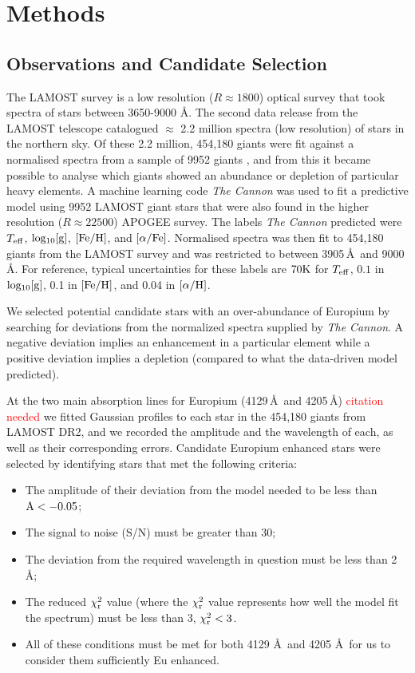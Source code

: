 \documentclass[a4paper,fleqn,usenatbib]{mnras}
\newcommand{\todo}[1]{\textcolor{red}{#1}}
\begin{document}
	\section{Methods}
	
	\subsection{Observations and Candidate Selection}
	
	The LAMOST survey is a low resolution ($R\approx1800$) optical survey that took spectra of stars between 3650-9000 \AA. The second data release from the LAMOST telescope catalogued $\approx$ 2.2 million spectra (low resolution) of stars in the northern sky. Of these 2.2 million, 454,180 giants were fit against a normalised spectra from a sample of 9952 giants \citep{AnnaHo2017}, and from this it became possible to analyse which giants showed an abundance or depletion of particular heavy elements. A machine learning code \textit{The Cannon} was used to fit a predictive model using 9952 LAMOST giant stars that were also found in the higher resolution ($R\approx22500$) APOGEE survey. The labels \textit{The Cannon} predicted were $T_{\rm{eff}}$, $\rm{log_{10}[g]}$, $\rm{[Fe/H]}$, and $\rm{[\alpha/Fe]}$. Normalised spectra was then fit to 454,180 giants from the LAMOST survey and was restricted to between 3905\,\AA\ and 9000\,\AA. For reference, typical uncertainties for these labels are $70\rm{K}$ for $T_{\rm{eff}}$, $0.1$ in $\rm{log_{10}[g]}$, 0.1 in $\rm{[Fe/H]}$, and 0.04 in $\rm{[\alpha/H]}$.
	
	We selected potential candidate stars with an over-abundance of Europium by searching for deviations from the normalized spectra supplied by \textit{The Cannon}. A negative deviation implies an enhancement in a particular element while a positive deviation implies a depletion (compared to what the data-driven model predicted). 
	
	At the two main absorption lines for Europium (4129\,\AA\ and 4205\,\AA) \todo{citation needed} we fitted Gaussian profiles to each star in the 454,180 giants from LAMOST DR2, and we recorded the amplitude and the wavelength of each, as well as their corresponding errors. Candidate Europium enhanced stars were selected by identifying stars that met the following criteria:
	
	\begin{itemize}
		\item The amplitude of their deviation from the model needed to be less than $\rm{A}<-0.05$;
		\item The signal to noise (S/N) must be greater than 30;
		\item The deviation from the required wavelength in question must be less than 2 \AA;
		\item The reduced $\chi_{\rm{r}}^{2}$ value (where the $\chi_{\rm{r}}^{2}$ value represents how well the model fit the spectrum) must be less than 3, $\chi_{\rm{r}}^{2}<3$.
		\item All of these conditions must be met for both 4129 \AA\ and 4205 \AA\ for us to consider them sufficiently Eu enhanced.
	\end{itemize}   
	
\end{document}
